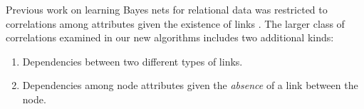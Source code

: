 \documentclass{article}
\begin{document}
%

Previous work on learning Bayes nets for relational data was restricted to correlations among attributes given the existence of links \cite{Schulte2012}. The larger class of correlations examined in our new algorithms includes two additional kinds:

\begin{enumerate}
\item Dependencies between two different types of links.
\item Dependencies among node attributes given the {\em absence} of a link between the node.
\end{enumerate}

%
%
%
\end{document}
